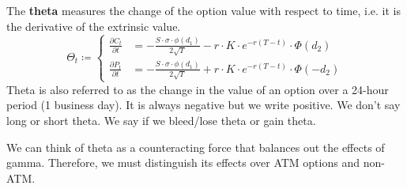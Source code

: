 \documentclass{article}
\begin{document}
    \begin{definition}[Theta]
      The \textbf{theta} measures the change of the option value with respect to time, i.e. it is the derivative of the extrinsic value. 
      \begin{equation}
        \Theta_t \coloneqq \begin{cases} 
          \frac{\partial C_t}{\partial t} & =  -\frac{S \cdot \sigma \cdot \phi(d_1)}{2 \sqrt{T}} - r \cdot K \cdot e^{-r(T - t)} \cdot \Phi(d_2) \\ 
          \frac{\partial P_t}{\partial t} & = -\frac{S \cdot \sigma \cdot \phi(d_1)}{2 \sqrt{T}} + r \cdot K \cdot e^{-r(T - t)} \cdot \Phi(-d_2)
        \end{cases}
      \end{equation}
      Theta is also referred to as the change in the value of an option over a 24-hour period (1 business day). It is always negative but we write positive. We don't say long or short theta. We say if we bleed/lose theta or gain theta.
    \end{definition}

    We can think of theta as a counteracting force that balances out the effects of gamma. Therefore, we must distinguish its effects over ATM options and non-ATM. 
\end{document}
